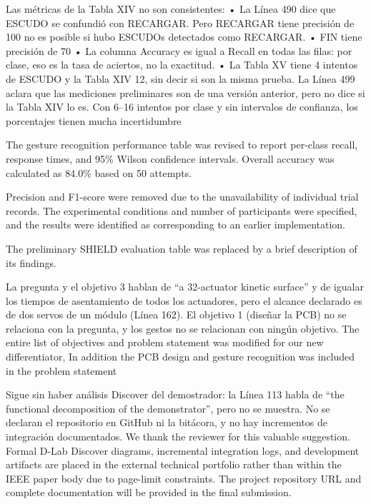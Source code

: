 \documentclass{LabDSTresponse}
\begin{document}
	{Las métricas de la Tabla XIV no son consistentes:
		• La Línea 490 dice que ESCUDO se confundió con RECARGAR. Pero RECARGAR tiene precisión de 100%
		no es posible si hubo ESCUDOs detectados como RECARGAR.
		• FIN tiene precisión de 70%
		• La columna Accuracy es igual a Recall en todas las filas: por clase, eso es la tasa de aciertos, no la exactitud.
		• La Tabla XV tiene 4 intentos de ESCUDO y la Tabla XIV 12, sin decir si son la misma prueba. La Línea 499 aclara
		que las mediciones preliminares son de una versión anterior, pero no dice si la Tabla XIV lo es.
		Con 6–16 intentos por clase y sin intervalos de confianza, los porcentajes tienen mucha incertidumbre}
	{The gesture recognition performance table was revised to
	report per-class recall, response times, and 95\% Wilson
	confidence intervals. Overall accuracy was calculated as
	84.0\% based on 50 attempts.

	Precision and F1-score were removed due to the unavailability
	of individual trial records. The experimental conditions
	and number of participants were specified, and the results
	were identified as corresponding to an earlier implementation.

	The preliminary SHIELD evaluation table was replaced by a
	brief description of its findings.}
	
	{La pregunta y el objetivo 3 hablan de “a 32-actuator kinetic surface” y de igualar los tiempos de asentamiento de todos
		los actuadores, pero el alcance declarado es de dos servos de un módulo (Línea 162). El objetivo 1 (diseñar la PCB) no se
		relaciona con la pregunta, y los gestos no se relacionan con ningún objetivo.}
	{The entire list of objectives and problem statement was modified for our new differentiator, In addition the PCB design and gesture recognition was included in the problem statement}
	
	{Sigue sin haber análisis Discover del demostrador: la Línea 113 habla de “the functional decomposition of the demonstrator”, pero no se muestra. No se declaran el repositorio en GitHub ni la bitácora, y no hay incrementos de integración
		documentados.}
	{We thank the reviewer for this valuable suggestion. Formal D-Lab Discover diagrams, incremental integration logs, and development artifacts are placed in the external technical portfolio rather than within the IEEE paper body due to page-limit constraints. The project repository URL and complete documentation will be provided in the final submission.}
	
	
\end{document}

